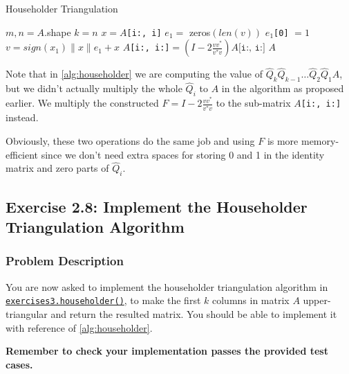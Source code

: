 \begin{algorithm}[H]
  \caption{Householder Triangulation}
  \label{alg:householder}
  \begin{algorithmic}[1]
  \State $m, n = A$.shape
    \State $k = n$  
  \EndIf
         \State $x = A$\texttt{[i:, i]}
         \State $e_1 = $ zeros$(len(v))$
         \State $e_1$\texttt{[0]} $= 1$ 
         \State $v = sign(x_1)\|x\|e_1 + x$
         \State $A$\texttt{[i:, i:]}$ = (I - 2\frac{vv^{*}}{v^{*}v})A\texttt{[i:, i:]}$
     \EndFor
    \State \Return \(A\) 
  \EndProcedure
  \end{algorithmic}
\end{algorithm}
\noindent Note that in \autoref{alg:householder} we are computing the value of $\hat{Q}_{k}\hat{Q}_{k-1}\ldots \hat{Q}_2 \hat{Q}_1A$, but we didn't actually multiply the whole $\hat{Q}_i$ to $A$ in the algorithm as proposed earlier. We multiply the constructed $F = I - 2\frac{vv^{*}}{v^{*}v}$ to the sub-matrix $A$\texttt{[i:, i:]} instead. \medskip

\noindent Obviously, these two operations do the same job and using $F$ is more memory-efficient since we don't need extra spaces for storing 0 and 1 in the identity matrix and zero parts of $\hat{Q}_{i}$.
\subsection*{Exercise 2.8: Implement the Householder Triangulation Algorithm}
\subsubsection*{Problem Description}%
You are now asked to implement the householder triangulation algorithm in \href{https://comp-lin-alg.github.io/cla_utils.html#cla_utils.exercises3.householder}{\texttt{exercises3.householder()}}, to make the first \(k\)  columns in matrix \(A\)  upper-triangular and return the resulted matrix. You should be able to implement it with reference of \autoref{alg:householder}. \medskip

\noindent \textbf{Remember to check your implementation passes the provided test cases.} \medskip

